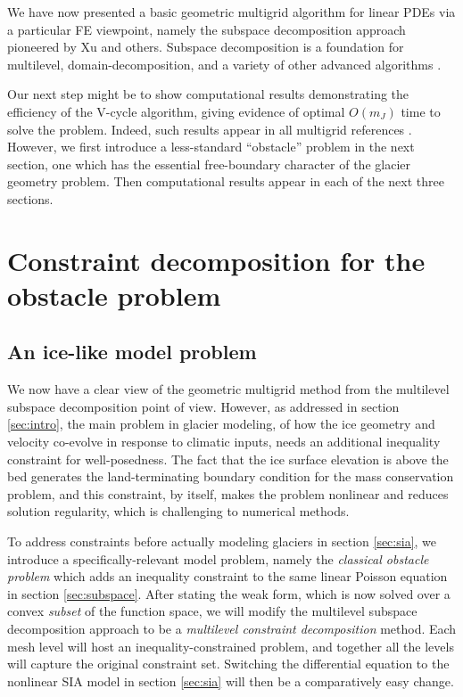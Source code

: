 \documentclass[letterpaper,final,12pt,reqno]{amsart}
\theoremstyle{claim}
\numberwithin{equation}{section}
\numberwithin{figure}{section}
\numberwithin{table}{section}
\numberwithin{theorem}{section}
\begin{document}
We have now presented a basic geometric multigrid algorithm for linear PDEs via a particular FE viewpoint, namely the subspace decomposition approach pioneered by Xu \cite{Xu1992} and others.  Subspace decomposition is a foundation for multilevel, domain-decomposition, and a variety of other advanced algorithms \cite{Braess2007,Farrelletal2019}.

Our next step might be to show computational results demonstrating the efficiency of the V-cycle algorithm, giving evidence of optimal $O(m_J)$ time to solve the problem.  Indeed, such results appear in all multigrid references \cite{Briggsetal2000,Bueler2021,Elmanetal2014,Trottenbergetal2001}.  However, we first introduce a less-standard ``obstacle'' problem in the next section, one which has the essential free-boundary character of the glacier geometry problem.  Then computational results appear in each of the next three sections.


\section{Constraint decomposition for the obstacle problem} \label{sec:obstacle}

\subsection*{An ice-like model problem}  We now have a clear view of the geometric multigrid method from the multilevel subspace decomposition point of view.  However, as addressed in section \ref{sec:intro}, the main problem in glacier modeling, of how the ice geometry and velocity co-evolve in response to climatic inputs, needs an additional inequality constraint for well-posedness.  The fact that the ice surface elevation is above the bed generates the land-terminating boundary condition for the mass conservation problem, and this constraint, by itself, makes the problem nonlinear and reduces solution regularity, which is challenging to numerical methods.

To address constraints before actually modeling glaciers in section \ref{sec:sia}, we introduce a specifically-relevant model problem, namely the \emph{classical obstacle problem} which adds an inequality constraint to the same linear Poisson equation in section \ref{sec:subspace}.  After stating the weak form, which is now solved over a convex \emph{subset} of the function space, we will modify the multilevel subspace decomposition approach to be a \emph{multilevel constraint decomposition} method.  Each mesh level will host an inequality-constrained problem, and together all the levels will capture the original constraint set.  Switching the differential equation to the nonlinear SIA model in section \ref{sec:sia} will then be a comparatively easy change.
\end{document}
